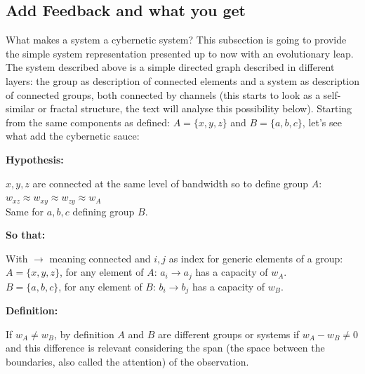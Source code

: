 \documentclass[14pt]{extarticle}
\begin{document}
\subsection*{Add Feedback and what you get}
\label{subsec:feedback}
\hspace*{15mm}What makes a system a cybernetic system? This subsection is going to provide the simple system representation presented up to now with an evolutionary leap. The system described above is a simple directed graph described in different layers: the group as description of connected elements and a system as description of connected groups, both connected by channels (this starts to look as a self-similar or fractal structure, the text will analyse this possibility below). 
Starting from the same components as defined: \(A = \{x, y, z\}\) and \(B = \{a, b, c\}\), let’s see what add the cybernetic sauce:

\textbf{Hypothesis:}
\begin{center}
\(x, y, z\) are connected at the same level of bandwidth so to define group \(A\):\\
\(w_{xz} \approx w_{xy} \approx w_{zy} \approx w_A\)\\
Same for \(a, b, c\) defining group \(B\).
\end{center}
\textbf{So that:}
\newline
\begin{center}
With $\rightarrow$ meaning connected and \(i,j\) as index for generic elements of a group:\\
\(A = \{ x, y, z \}\),
for any element of \(A\): \(a_i \rightarrow a_j\) has a capacity of \(w_A\).\\
\(B = \{ a, b, c \}\),
for any element of \(B\): \(b_i \rightarrow b_j\) has a capacity of \(w_B\).\\
\end{center}
\textbf{Definition:}
\newline
\begin{center}
If \(w_A \neq w_B\), by definition \(A\) and \(B\) are different groups or systems if \(w_A - w_B \neq 0\) and this difference is relevant considering the span (the space between the boundaries, also called the attention) of the observation.
\end{center}
\end{document}
